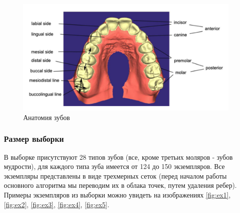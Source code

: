\begin{figure}[h]
\includegraphics[width=1\linewidth]{images/dental_parts.png}
\caption{Анатомия зубов}
\label{fig:dental_parts}
\end{figure}


\subsubsection{Размер выборки}

В выборке присутствуют 28 типов зубов (все, кроме третьих моляров - зубов мудрости), для каждого типа зуба имеется от 124 до 150 экземпляров. Все экземпляры представлены в виде трехмерных сеток (перед началом работы основного алгоритма мы переводим их в облака точек, путем удаления ребер). Примеры экземпляров из выборки можно увидеть на  изображениях \ref{fig:ex1},  \ref{fig:ex2}, \ref{fig:ex3},  \ref{fig:ex4}, \ref{fig:ex5}.





